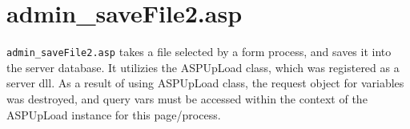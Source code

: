 \section{admin\_saveFile2.asp}

\verb|admin_saveFile2.asp| takes a file selected by a form process, and saves it into
the server database.  It utilizies the ASPUpLoad class, which was registered as
a server dll. As a result of using ASPUpLoad class, the request object for
variables was destroyed, and query vars must be accessed within the context of
the ASPUpLoad instance for this page/process.


